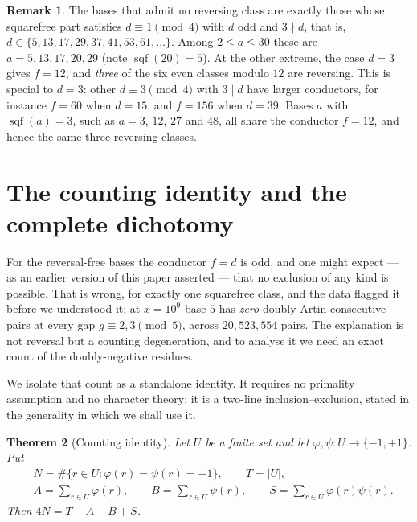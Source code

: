 \documentclass[11pt,reqno]{amsart}
\theoremstyle{plain}
\newtheorem{theorem}{Theorem}
\theoremstyle{definition}
\newtheorem{remark}[theorem]{Remark}
\DeclareMathOperator{\sqf}{sqf}
\begin{document}
\begin{remark}
\label{rem:reversalfree}
The bases that admit no reversing class are exactly those whose squarefree
part satisfies $d \equiv 1 \pmod 4$ with $d$ odd and $3 \nmid d$, that is,
$d \in \{5, 13, 17, 29, 37, 41, 53, 61, \dots\}$. Among $2 \le a \le 30$ these are $a = 5, 13, 17, 20, 29$
(note $\sqf(20) = 5$). At the other extreme, the case $d = 3$ gives $f = 12$,
and \emph{three} of the six even classes modulo $12$ are reversing. This is
special to $d = 3$: other $d \equiv 3 \pmod 4$ with $3 \mid d$ have larger
conductors, for instance $f = 60$ when $d = 15$, and $f = 156$ when $d = 39$.
Bases $a$ with $\sqf(a) = 3$, such as $a = 3$, $12$, $27$ and $48$, all share
the conductor $f = 12$, and hence the same three reversing classes.
\end{remark}

\section{The counting identity and the complete dichotomy}
\label{sec:identity}

For the reversal-free bases the conductor $f = d$ is odd, and one might expect
--- as an earlier version of this paper asserted --- that no exclusion of any
kind is possible. That is wrong, for exactly one squarefree class, and the
data flagged it before we understood it: at $x = 10^9$ base $5$ has
\emph{zero} doubly-Artin consecutive pairs at every gap
$g \equiv 2, 3 \pmod 5$, across $20{,}523{,}554$ pairs. The explanation is not
reversal but a counting degeneration, and to analyse it we need an exact count
of the doubly-negative residues.

We isolate that count as a standalone identity. It requires no primality
assumption and no character theory: it is a two-line inclusion--exclusion,
stated in the generality in which we shall use it.

\begin{theorem}[Counting identity]
\label{thm:identity}
Let $U$ be a finite set and let $\varphi, \psi : U \to \{-1, +1\}$. Put
\begin{align*}
  &N = \#\{ r \in U : \varphi(r) = \psi(r) = -1 \}, \qquad T = |U|,\\
  &A = \sum_{r \in U} \varphi(r), \qquad
   B = \sum_{r \in U} \psi(r), \qquad
   S = \sum_{r \in U} \varphi(r)\psi(r).
\end{align*}
Then $4N = T - A - B + S$.
\end{theorem}
\end{document}
